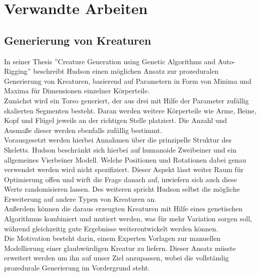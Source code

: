 \chapter{Verwandte Arbeiten}
\label{Verwandte_Arbeiten}


\section{Generierung von Kreaturen}
In seiner Thesis ''Creature Generation using Genetic Algorithms and Auto-Rigging'' \cite{Hudson2013CreatureGU} beschreibt Hudson einen möglichen Ansatz zur prozeduralen Generierung von Kreaturen, basierend auf Parametern in Form von Minima und Maxima für Dimensionen einzelner Körperteile.\\ Zunächst wird ein Torso generiert, der aus drei mit Hilfe der Parameter zufällig skalierten Segmenten besteht. Daran werden weitere Körperteile wie Arme, Beine, Kopf und Flügel jeweils an der richtigen Stelle platziert. Die Anzahl und Ausmaße dieser werden ebenfalls zufällig bestimmt.\\
Vorausgesetzt werden hierbei Annahmen über die prinzipelle Struktur des Skeletts. Hudson beschränkt sich hierbei auf humanoide Zweibeiner und ein allgemeines Vierbeiner Modell. Welche Positionen und Rotationen dabei genau verwendet werden wird nicht spezifiziert. Dieser Aspekt lässt weiter Raum für Optimierung offen und wirft die Frage danach auf, inwiefern sich auch diese Werte randomisieren lassen. Des weiteren spricht Hudson selbst die mögliche Erweiterung auf andere Typen von Kreaturen an.\\
Außerdem können die daraus erzeugten Kreaturen mit Hilfe eines genetischen Algorithmus kombiniert und mutiert werden, was für mehr Variation sorgen soll, während gleichzeitig gute Ergebnisse weiterentwickelt werden können.\\
Die Motivation besteht darin, einem Experten Vorlagen zur manuellen Modellierung einer glaubwürdigen Kreatur zu liefern. Dieser Ansatz müsste erweitert werden um ihn auf unser Ziel anzupassen, wobei die vollständig prozedurale Generierung im Vordergrund steht.

